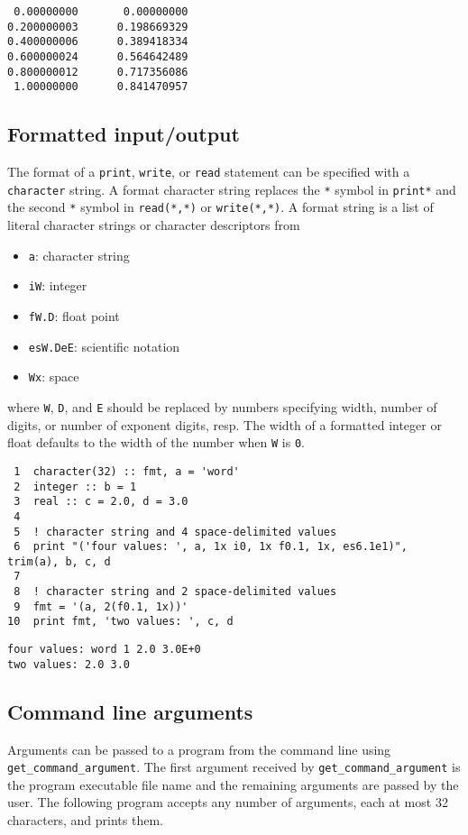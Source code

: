 \documentclass[11pt]{article}
\begin{document}
\begin{verbatim}
 0.00000000       0.00000000    
0.200000003      0.198669329    
0.400000006      0.389418334    
0.600000024      0.564642489    
0.800000012      0.717356086    
 1.00000000      0.841470957    
\end{verbatim}

\subsection{Formatted input/output}
\label{sec:orgheadline38}
The format of a \texttt{print}, \texttt{write}, or \texttt{read} statement can be specified with a \texttt{character} string. A format character string replaces the \texttt{*} symbol in \texttt{print*} and the second \texttt{*} symbol in \texttt{read(*,*)} or \texttt{write(*,*)}. A format string is a list of literal character strings or character descriptors from
\begin{itemize}
\item \texttt{a}: character string
\item \texttt{iW}: integer
\item \texttt{fW.D}: float point
\item \texttt{esW.DeE}: scientific notation
\item \texttt{Wx}: space
\end{itemize}
where \texttt{W}, \texttt{D}, and \texttt{E} should be replaced by numbers specifying width, number of digits, or number  of exponent digits, resp. The width of a formatted integer or float defaults to the width of the number when \texttt{W} is \texttt{0}.

\begin{verbatim}
 1  character(32) :: fmt, a = 'word' 
 2  integer :: b = 1
 3  real :: c = 2.0, d = 3.0
 4  
 5  ! character string and 4 space-delimited values
 6  print "('four values: ', a, 1x i0, 1x f0.1, 1x, es6.1e1)", trim(a), b, c, d
 7  
 8  ! character string and 2 space-delimited values
 9  fmt = '(a, 2(f0.1, 1x))'
10  print fmt, 'two values: ', c, d
\end{verbatim}

\begin{verbatim}
four values: word 1 2.0 3.0E+0
two values: 2.0 3.0
\end{verbatim}

\subsection{Command line arguments}
\label{sec:orgheadline39}
Arguments can be passed to a program from the command line using \texttt{get\_command\_argument}. The first argument received by \texttt{get\_command\_argument} is the program executable file name and the remaining arguments are passed by the user. The following program accepts any number of arguments, each at most 32 characters, and prints them.
\end{document}
